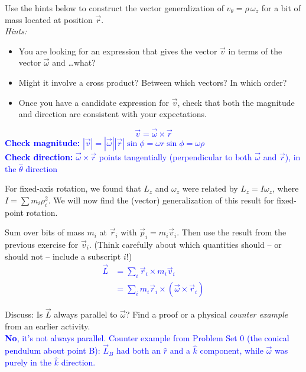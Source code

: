\documentclass[11pt, letterpaper, openany]{book}
\newenvironment{exercise}[1][Exercise]{%
  \tcolorbox[blanker, breakable, left=1em,
    before skip=1em, after skip=1em,
    borderline west={3pt}{0pt}{PhysNavy},
    colback=PhysCream,
    before upper={\textcolor{PhysNavy}{\sffamily\bfseries #1:}\space}
  ]%
}{%
  \endtcolorbox%
}
\begin{document}
\begin{exercise}[Exercise 6]
Use the hints below to construct the vector generalization of $v_\theta = \rho\,\omega_z$ for a bit of mass located at position $\vec{r}$. \\
\textit{Hints:}
\begin{itemize}
    \item You are looking for an expression that gives the vector $\vec{v}$ in terms of the vector $\vec{\omega}$ and \ldots what?
    \item Might it involve a cross product? Between which vectors? In which order?
    \item Once you have a candidate expression for $\vec{v}$, check that both the magnitude and direction are consistent with your expectations.
\end{itemize}
\textcolor{blue}{
\[ \vec{v} = \vec{\omega} \times \vec{r} \]
\textbf{Check magnitude:} $|\vec{v}| = |\vec{\omega}||\vec{r}|\sin\phi = \omega r \sin\phi = \omega \rho$ \checkmark \\
\textbf{Check direction:} $\vec{\omega} \times \vec{r}$ points tangentially (perpendicular to both $\vec{\omega}$ and $\vec{r}$), in the $\hat{\theta}$ direction \checkmark
}
\end{exercise}

For fixed-axis rotation, we found that $L_z$ and $\omega_z$ were related by $L_z = I\omega_z$, where $I = \sum m_i \rho_i^2$. We will now find the (vector) generalization of this result for fixed-point rotation.

\begin{exercise}[Exercise 7]
Sum over bits of mass $m_i$ at $\vec{r}_i$ with $\vec{p}_i = m_i\vec{v}_i$. Then use the result from the previous exercise for $\vec{v}_i$. (Think carefully about which quantities should -- or should not -- include a subscript $i$!) \\
\textcolor{blue}{
\begin{align*}
    \vec{L} &= \sum_i \vec{r}_i \times m_i\vec{v}_i \\
    &= \sum_i m_i \vec{r}_i \times (\vec{\omega} \times \vec{r}_i) \tag{$*$}
\end{align*}
}

Discuss: Is $\vec{L}$ always parallel to $\vec{\omega}$? Find a proof or a physical \textit{counter example} from an earlier activity. \\
\textcolor{blue}{
\textbf{No}, it's not always parallel. Counter example from Problem Set 0 (the conical pendulum about point B): $\vec{L}_B$ had both an $\hat{r}$ and a $\hat{k}$ component, while $\vec{\omega}$ was purely in the $\hat{k}$ direction.
}
\end{exercise}
\end{document}
